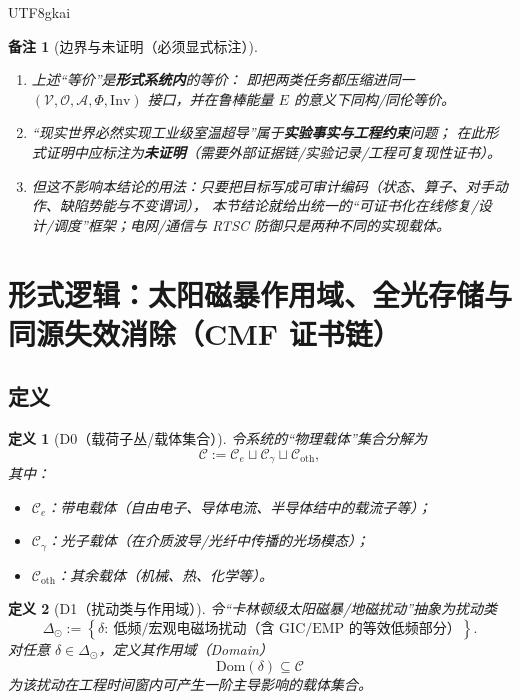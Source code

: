 \documentclass[12pt]{article}
\newtheorem{definition}{定义}[section]
\newtheorem{remark}{备注}[section]
\begin{document}
\begin{CJK*}{UTF8}{gkai}
\begin{remark}[边界与未证明（必须显式标注）]
\label{rem:tex27-ch16-r1}
\begin{enumerate}
  \item 上述“等价”是\textbf{形式系统内}的等价：
  即把两类任务都压缩进同一 $(\mathcal{V},\mathcal{O},\mathcal{A},\Phi,\mathrm{Inv})$ 接口，并在鲁棒能量 $E$ 的意义下同构/同伦等价。
  \item “现实世界必然实现工业级室温超导”属于\textbf{实验事实与工程约束}问题；
  在此形式证明中应标注为\textbf{未证明}（需要外部证据链/实验记录/工程可复现性证书）。
  \item 但这不影响本结论的用法：只要把目标写成可审计编码（状态、算子、对手动作、缺陷势能与不变谓词），
  本节结论就给出统一的“可证书化在线修复/设计/调度”框架；电网/通信与 RTSC 防御只是两种不同的实现载体。
\end{enumerate}
\end{remark}

\clearpage

\section{形式逻辑：太阳磁暴作用域、全光存储与同源失效消除（CMF 证书链）}
\label{sec:tex27-ch16b-solar-cmf}

\subsection{定义}
\label{subsec:tex27-ch16b-defs}

\begin{definition}[D0（载荷子丛/载体集合）]
\label{def:tex27-ch16b-d0}
令系统的“物理载体”集合分解为
\[
  \mathcal{C}
  :=
  \mathcal{C}_{e}\sqcup\mathcal{C}_{\gamma}\sqcup\mathcal{C}_{\mathrm{oth}},
\]
其中：
\begin{itemize}
  \item $\mathcal{C}_{e}$：带电载体（自由电子、导体电流、半导体结中的载流子等）；
  \item $\mathcal{C}_{\gamma}$：光子载体（在介质波导/光纤中传播的光场模态）；
  \item $\mathcal{C}_{\mathrm{oth}}$：其余载体（机械、热、化学等）。
\end{itemize}
\end{definition}

\begin{definition}[D1（扰动类与作用域）]
\label{def:tex27-ch16b-d1}
令“卡林顿级太阳磁暴/地磁扰动”抽象为扰动类
\[
  \Delta_{\odot}
  :=
  \left\{
    \delta:\ \text{低频/宏观电磁场扰动（含 GIC/EMP 的等效低频部分）}
  \right\}.
\]
对任意 $\delta\in\Delta_{\odot}$，定义其作用域（Domain）
\[
  \mathrm{Dom}(\delta)\subseteq\mathcal{C}
\]
为该扰动在工程时间窗内可产生一阶主导影响的载体集合。
\end{definition}


\end{CJK*}
\end{document}
